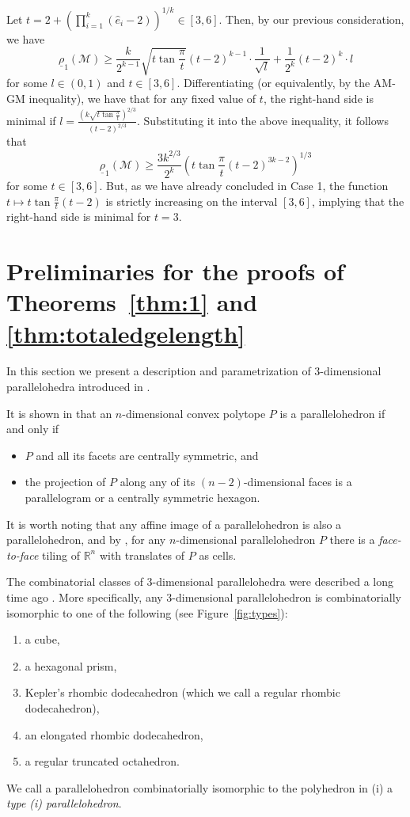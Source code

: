 \documentclass[twoside]{amsart}
\theoremstyle{definition}
\renewcommand{\Re}{\mathbb R}
\newcommand{\M}{\mathcal{M}}
\begin{document}
Let $t= 2+\left( \prod_{i=1}^k \left( \hat{e}_i-2\right) \right)^{1/k} \in [3,6]$. Then, by our previous consideration, we have
\[
\underline{\rho}_1(\M) \geq \frac{k}{2^{k-1}} \sqrt{t \tan \frac{\pi}{t}} (t-2)^{k-1} \cdot \frac{1}{\sqrt{l}} + \frac{1}{2^k} (t-2)^k \cdot l
\]
for some $l \in (0,1)$ and $t \in [3,6]$. Differentiating (or equivalently, by the AM-GM inequality), we have that for any fixed value of $t$, the right-hand side is minimal if $l=\frac{\left( k \sqrt{t \tan \frac{\pi}{t}} \right)^{2/3}}{(t-2)^{2/3}}$. Substituting it into the above inequality, it follows that
\[
\underline{\rho}_1(\M) \geq \frac{3 k^{2/3}}{2^k} \left( t \tan \frac{\pi}{t} (t-2)^{3k-2} \right)^{1/3}
\]
for some $t \in [3,6]$. But, as we have already concluded in Case 1, the function $t \mapsto t \tan \frac{\pi}{t} (t-2)$ is strictly increasing on the interval $[3,6]$, implying that the right-hand side is minimal for $t=3$.





\section{Preliminaries for the proofs of Theorems~\ref{thm:1} and \ref{thm:totaledgelength}}\label{sec:prelim}

In this section we present a description and parametrization of $3$-dimensional parallelohedra introduced in \cite{Langi}.

It is shown in \cite{Minkowski, Venkov} that an $n$-dimensional convex polytope $P$ is a parallelohedron if and only if
\begin{itemize}
\item[(i)] $P$ and all its facets are centrally symmetric, and
\item[(ii)] the projection of $P$ along any of its $(n-2)$-dimensional faces is a parallelogram or a centrally symmetric hexagon.
\end{itemize}
It is worth noting that any affine image of a parallelohedron is also a parallelohedron, and by \cite{Dolbilin}, for any $n$-dimensional parallelohedron $P$ there is a \emph{face-to-face} tiling of $\Re^n$ with translates of $P$ as cells.

The combinatorial classes of $3$-dimensional parallelohedra were described a long time ago \cite{Fedorov}. More specifically, any 
$3$-dimensional parallelohedron is combinatorially isomorphic to one of the following (see Figure~\ref{fig:types}):
\begin{enumerate}
\item[(1)] a cube,
\item[(2)] a hexagonal prism,
\item[(3)] Kepler's rhombic dodecahedron (which we call a regular rhombic dodecahedron),
\item[(4)] an elongated rhombic dodecahedron,
\item[(5)] a regular truncated octahedron.
\end{enumerate}
We call a parallelohedron combinatorially isomorphic to the polyhedron in (i) a \emph{type (i) parallelohedron}.
\end{document}
